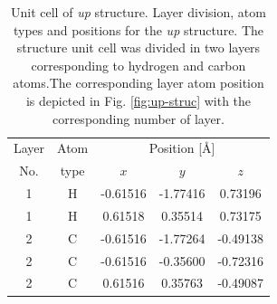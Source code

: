 \documentclass[prb,11pt,tightenlines,twocolumn,aps]{revtex4-1}
\begin{document}
\begin{table}[tb]
\center
\begin{tabular}{ccccc}\\
\hline
Layer & Atom & \multicolumn{3}{c}{Position [\AA]} \\
\cline{3-5}
No. & type & $x$ & $y$ & $z$  \\
\hline
1 & H & -0.61516 & -1.77416 &  0.73196 \\
1 & H &  0.61518 &  0.35514 &  0.73175 \\
2 & C & -0.61516 & -1.77264 & -0.49138 \\
2 & C & -0.61516 & -0.35600 & -0.72316 \\
2 & C &  0.61516 &  0.35763 & -0.49087 \\
\hline
\end{tabular}
\caption{Unit cell of \emph{up} structure. Layer division, atom types and
positions for the \emph{up} structure. The structure unit cell was divided in
two layers corresponding to hydrogen and carbon atoms.The corresponding layer
atom position is depicted in Fig. \ref{fig:up-struc} with the corresponding
number of layer.}
\label{tab:up-unitcell}
\end{table}



\end{document}

